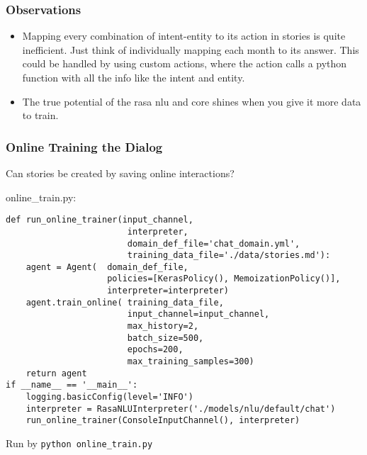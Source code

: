  \begin{frame}[fragile]\frametitle{Observations}

\begin{itemize}
\item Mapping every combination of intent-entity to its action in stories is quite inefficient. Just think of individually mapping each month to its answer. This could be handled by using custom actions, where the action calls a python function with all the info like the intent and entity.
\item The true potential of the rasa nlu and core shines when you give it more data to train.
\end{itemize}
\end{frame}


 \begin{frame}[fragile]\frametitle{Online Training the Dialog}
 Can stories be created by saving online interactions?
 
online\_train.py:
\begin{lstlisting}
def run_online_trainer(input_channel,
                        interpreter,
                        domain_def_file='chat_domain.yml',
                        training_data_file='./data/stories.md'):
    agent = Agent(  domain_def_file,
                    policies=[KerasPolicy(), MemoizationPolicy()],
                    interpreter=interpreter)
    agent.train_online( training_data_file,
                        input_channel=input_channel,
                        max_history=2,
                        batch_size=500,
                        epochs=200,
                        max_training_samples=300)
    return agent
if __name__ == '__main__':
    logging.basicConfig(level='INFO')
    interpreter = RasaNLUInterpreter('./models/nlu/default/chat')
    run_online_trainer(ConsoleInputChannel(), interpreter)
\end{lstlisting}

Run by \lstinline|python online_train.py|

\end{frame}


